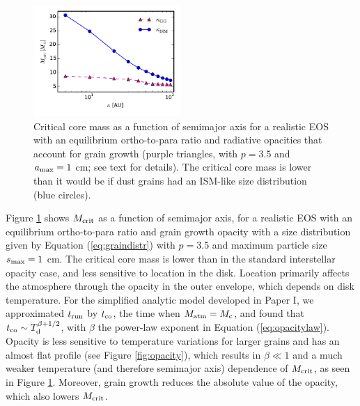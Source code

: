 \begin{figure}[h!]
\centering
\includegraphics[width=0.5\textwidth]{figures/Mcrit_vs_a_gg.pdf}
\caption{Critical core mass as a function of semimajor axis for a realistic EOS with an equilibrium ortho-to-para ratio and radiative opacities that account for grain growth (purple triangles, with $p=3.5$ and $a_{\rm max}=1$ cm; see text for details). The critical core mass is lower than it would be if dust grains had an ISM-like size distribution (blue circles).}
\label{fig:Mcritvsagg}
\end{figure}

Figure \ref{fig:Mcritvsagg} shows $M_{\rm crit}$ as a function of semimajor axis, for a realistic EOS with an equilibrium ortho-to-para ratio and grain growth opacity with a size distribution given by Equation (\ref{eq:graindistr}) with $p=3.5$ and maximum particle size $s_{\rm max}=1$ cm. The critical core mass is lower than in the standard interstellar opacity case, and less sensitive to location in the disk. Location primarily affects the atmosphere through the opacity in the outer envelope, which depends on disk temperature. For the simplified analytic model developed in Paper I, we approximated $t_{\rm run}$ by  $t_{\rm co}$, the time when $M_{\rm atm}=M_{\rm c}$, and found that $t_{\rm co} \sim T_{\rm d}^{\beta+1/2}$, with $\beta$ the power-law exponent in Equation (\ref{eq:opacitylaw}). Opacity is less sensitive to temperature variations for larger grains and has an almost flat profile (see Figure \ref{fig:opacity}), which results in $\beta \ll 1$ and a much weaker temperature (and therefore semimajor axis) dependence of $M_{\rm crit}$, as seen in Figure \ref{fig:Mcritvsagg}. Moreover, grain growth reduces the absolute value of the opacity, which also lowers $M_{\rm crit}$. %

